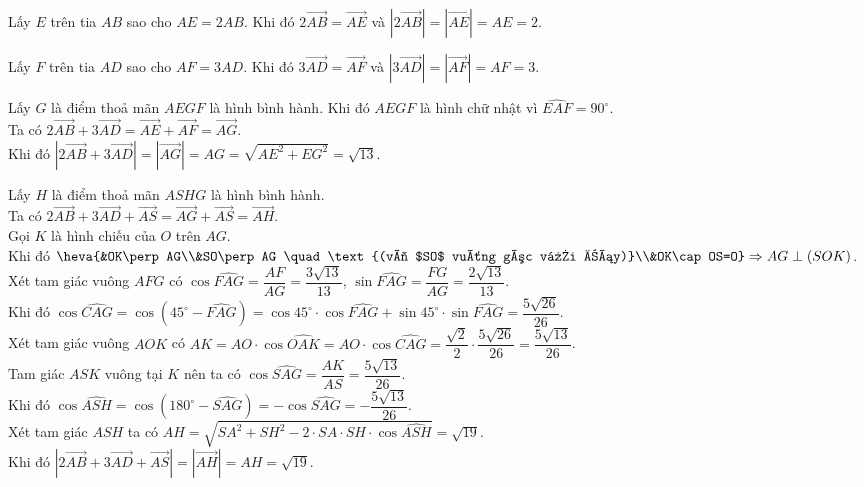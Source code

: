 \begin{bt}[Mức độ 3,4]
{\begin{listEX}[1]
    \item Lấy $E$ trên tia $AB$ sao cho $AE=2AB$. Khi đó $2\overrightarrow{AB}=\overrightarrow{AE}$ và $\left|2\overrightarrow{AB}\right|=\left|\overrightarrow{AE}\right|=AE=2$.
    \item Lấy $F$ trên tia $AD$ sao cho $AF=3AD$. Khi đó $3\overrightarrow{AD}=\overrightarrow{AF}$ và $\left|3\overrightarrow{AD}\right|=\left|\overrightarrow{AF}\right|=AF=3$.
    \item Lấy $G$ là điểm thoả mãn $AEGF$ là hình bình hành. Khi đó $AEGF$ là hình chữ nhật vì $\widehat{EAF}=90^\circ$.\\
    Ta có $2\overrightarrow{AB}+3\overrightarrow{AD}=\overrightarrow{AE}+\overrightarrow{AF}=\overrightarrow{AG}$.\\
    Khi đó $\left|2\overrightarrow{AB}+3\overrightarrow{AD}\right|=\left|\overrightarrow{AG}\right|=AG=\sqrt{AE^2+EG^2}=\sqrt{13}$.
    \item Lấy $H$ là điểm thoả mãn $ASHG$ là hình bình hành. \\
    Ta có $2\overrightarrow{AB}+3\overrightarrow{AD}+\overrightarrow{AS}=\overrightarrow{AG}+\overrightarrow{AS}=\overrightarrow{AH}$.\\
    Gọi $K$ là hình chiếu của $O$ trên $AG$.\\
    Khi đó $\heva{&OK\perp AG\\&SO\perp AG \quad \text{(vì $SO$ vuông góc với đáy)}\\&OK\cap OS=O}\Rightarrow AG\perp (SOK)$.\\
    Xét tam giác vuông $AFG$ có $\cos \widehat{FAG}=\dfrac{AF}{AG}=\dfrac{3\sqrt{13}}{13}$, $\sin \widehat{FAG}=\dfrac{FG}{AG}=\dfrac{2\sqrt{13}}{13}$. \\
    Khi đó $\cos \widehat{CAG} = \cos \left(45^\circ - \widehat{FAG}\right) = \cos 45^\circ\cdot\cos \widehat{FAG}+ \sin 45^\circ\cdot\sin \widehat{FAG}=\dfrac{5\sqrt{26}}{26}$.\\
    Xét tam giác vuông $AOK$ có $AK=AO\cdot \cos \widehat{OAK}=AO\cdot \cos \widehat{CAG}=\dfrac{\sqrt{2}}{2}\cdot \dfrac{5\sqrt{26}}{26}=\dfrac{5\sqrt{13}}{26}$. \\
    Tam giác $ASK$ vuông tại $K$ nên ta có $\cos \widehat{SAG}=\dfrac{AK}{AS}=\dfrac{5\sqrt{13}}{26}$.\\
    Khi đó $\cos \widehat{ASH}=\cos \left(180^\circ-\widehat{SAG}\right)=-\cos \widehat{SAG}=-\dfrac{5\sqrt{13}}{26}$.\\
    Xét tam giác $ASH$ ta có $AH=\sqrt{SA^2+SH^2-2\cdot SA \cdot SH\cdot \cos \widehat{ASH}}=\sqrt{19}$.\\
    Khi đó $\left|2\overrightarrow{AB}+3\overrightarrow{AD}+\overrightarrow{AS}\right|=\left|\overrightarrow{AH}\right|=AH=\sqrt{19}$.
\end{listEX}}
\end{bt}

